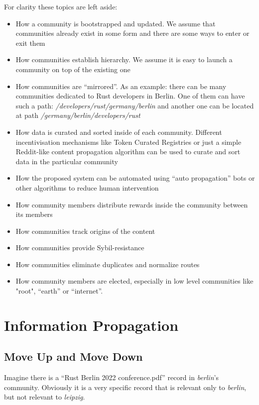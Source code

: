 \documentclass[10pt,a4paper]{article}
\begin{document}
For clarity these topics are left aside:
\begin{itemize}
    \item How a community is bootstrapped and updated. We assume that communities already exist in some form and there are some ways to enter or exit them
    \item How communities establish hierarchy. We assume it is easy to launch a community on top of the existing one
    \item How communities are “mirrored”. As an example: there can be many communities dedicated to Rust developers in Berlin. One of them can have such a path: {\em /developers/rust/germany/berlin} and another one can be located at path {\em /germany/berlin/developers/rust}
    \item How data is curated and sorted inside of each community. Different incentivisation mechanisms like Token Curated Registries or just a simple Reddit-like content propagation algorithm can be used to curate and sort data in the particular community
    \item How the proposed system can be automated using “auto propagation” bots or other algorithms to reduce human intervention
    \item How community members distribute rewards inside the community between its members
    \item How communities track origins of the content
    \item How communities provide Sybil-resistance
    \item How communities eliminate duplicates and normalize routes
    \item How community members are elected, especially in low level communities like "root", “earth” or “internet”.
\end{itemize}

\section{Information Propagation}
\subsection{Move Up and Move Down}

Imagine there is a “Rust Berlin 2022 conference.pdf” record in {\em berlin}'s community. Obviously it is a very specific record that is relevant only to {\em berlin}, but not relevant to {\em leipzig}.\newline
\end{document}
